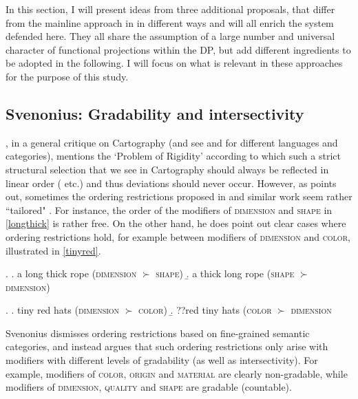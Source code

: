 In this section, I will present ideas from three additional proposals, that differ from the mainline approach in \citet{cinque:2005:deriving, cinque:2017:micro, cinque:2010:adj, cinque:2020:relcl} in different ways and will all enrich the system defended here. They all share the assumption of a large number and universal character of functional projections within the DP, but add different ingredients to be adopted in the following. I will focus on what is relevant in these approaches for the purpose of this study.

\subsection{Svenonius: Gradability and intersectivity} \label{svenonius}

\citet[249–250]{larson:2021:rethinking}, in a general critique on Cartography (and see \citealt{truswell:2004:attributive, truswell:2009:attributive, svenonius:2008:position, kotowski:2016:adj} and \citealt{kim:2019:syntax} for different languages and categories), mentions the `Problem of Rigidity' according to which such a strict structural selection that we see in Cartography should always be reflected in linear order (\citealt{kayne:1994:anti, cinque:2010:adj} etc.) and thus deviations should never occur. However, as \citet{svenonius:2008:position} points out, sometimes the ordering restrictions proposed in \citet{scott:2002:stacked} and similar work seem rather ``tailored" \citep[37]{svenonius:2008:position}. For instance, the order of the modifiers of \textsc{dimension} and \textsc{shape} in \ref{longthick} is rather free. On the other hand, he does point out clear cases where ordering restrictions hold, for example between modifiers of \textsc{dimension} and \textsc{color}, illustrated in \ref{tinyred}. 

\ex. \label{longthick} \a. a long thick rope (\textsc{dimension} $\succ$ \textsc{shape})
\b. a thick long rope (\textsc{shape} $\succ$ \textsc{dimension}) \null \hfill\citep[37]{svenonius:2008:position}

\ex. \label{tinyred} \a. tiny red hats (\textsc{dimension} $\succ$ \textsc{color})
\b. ??red tiny hats (\textsc{color} $\succ$ \textsc{dimension} \null \hfill\citep[36]{svenonius:2008:position}

Svenonius dismisses ordering restrictions based on fine-grained semantic categories, and instead argues that such ordering restrictions only arise with modifiers with different levels of gradability (as well as intersectivity). For example, modifiers of \textsc{color}, \textsc{origin} and \textsc{material} are clearly non-gradable, while modifiers of \textsc{dimension}, \textsc{quality} and \textsc{shape} are gradable (countable).

